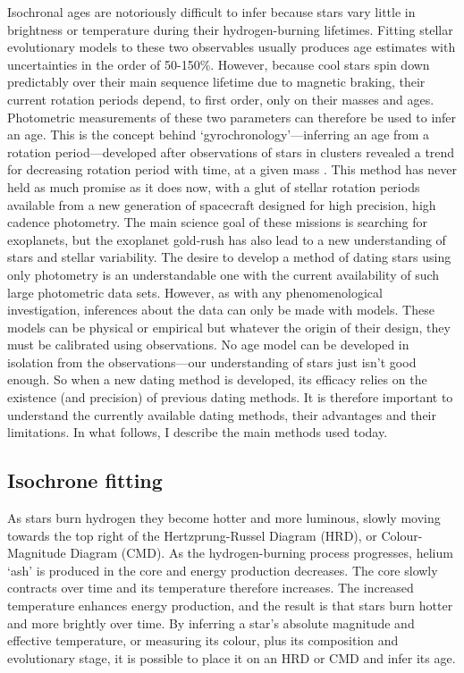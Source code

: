 Isochronal ages are notoriously difficult to infer because stars vary little
in brightness or temperature during their hydrogen-burning lifetimes.
Fitting stellar evolutionary models to these two observables usually produces
age estimates with uncertainties in the order of 50-150\%.
However, because cool stars spin down predictably over their main sequence
lifetime due to magnetic braking, their current rotation periods depend, to
first order, only on their masses and ages.
Photometric measurements of these two parameters can therefore be used to
infer an age.
This is the concept behind `gyrochronology'---inferring an age from a rotation
period---developed after observations of stars in clusters revealed a trend
for decreasing rotation period with time, at a given mass \citep{Weber1967,
Skumanich1972, Barnes2003, Irwin2009}.
This method has never held as much promise as it does now, with a glut of
stellar rotation periods available from a new generation of spacecraft
designed for high precision, high cadence photometry.
The main science goal of these missions is searching for exoplanets, but the
exoplanet gold-rush has also lead to a new understanding of stars and stellar
variability.
The desire to develop a method of dating stars using only photometry is an
understandable one with the current availability of such large photometric
data sets.
However, as with any phenomenological investigation, inferences about the data
can only be made with models.
These models can be physical or empirical but whatever the origin of their
design, they must be calibrated using observations.
No age model can be developed in isolation from the observations---our
understanding of stars just isn't good enough.
So when a new dating method is developed, its efficacy relies on the existence
(and precision) of previous dating methods.
It is therefore important to understand the currently available dating
methods, their advantages and their limitations.
In what follows, I describe the main methods used today.

\subsection{Isochrone fitting}

As stars burn hydrogen they become hotter and more luminous, slowly moving
towards the top right of the Hertzprung-Russel Diagram (HRD), or
Colour-Magnitude Diagram (CMD).
As the hydrogen-burning process progresses, helium `ash' is produced in the
core and energy production decreases.
The core slowly contracts over time and its temperature therefore increases.
The increased temperature enhances energy production, and the result is that
stars burn hotter and more brightly over time.
By inferring a star's absolute magnitude and effective temperature, or
measuring its colour, plus its composition and evolutionary stage, it is
possible to place it on an HRD or CMD and infer its age.

